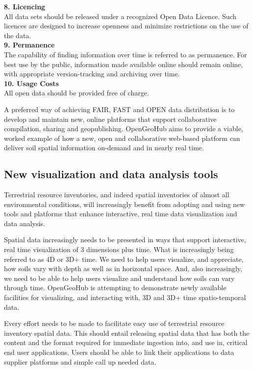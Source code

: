 \documentclass[graybox,natbib,nospthms,UStrade]{svmono}
\begin{document}
\textbf{8. Licencing}\\
All data sets should be released under a recognized Open Data Licence.
Such licences are designed to increase openness and minimize
restrictions on the use of the data.\\

\textbf{9. Permanence}\\
The capability of finding information over time is referred to as
permanence. For best use by the public, information made available
online should remain online, with appropriate version-tracking and
archiving over time.\\

\textbf{10. Usage Costs}\\
All open data should be provided free of charge.

A preferred way of achieving FAIR, FAST and OPEN data distribution is to
develop and maintain new, online platforms that support collaborative
compilation, sharing and geopublishing. OpenGeoHub aims to provide a
viable, worked example of how a new, open and collaborative web-based
platform can deliver soil spatial information on-demand and in nearly
real time.

\hypertarget{new-visualization-and-data-analysis-tools}{%
\subsection{New visualization and data analysis tools}\label{new-visualization-and-data-analysis-tools}}

Terrestrial resource inventories, and indeed spatial inventories of
almost all environmental conditions, will increasingly benefit from
adopting and using new tools and platforms that enhance interactive,
real time data visualization and data analysis.

Spatial data increasingly needs to be presented in ways that support
interactive, real time visualization of 3 dimensions plus time. What is
increasingly being referred to as 4D or 3D+ time. We need to help users
visualize, and appreciate, how soils vary with depth as well as in
horizontal space. And, also increasingly, we need to be able to help
users visualize and understand how soils can vary through time.
OpenGeoHub is attempting to demonstrate newly available facilities for
visualizing, and interacting with, 3D and 3D+ time spatio-temporal data.

Every effort needs to be made to facilitate easy use of terrestrial
resource inventory spatial data. This should entail releasing spatial
data that has both the content and the format required for immediate
ingestion into, and use in, critical end user applications. Users should
be able to link their applications to data supplier platforms and simple
call up needed data.
\end{document}
